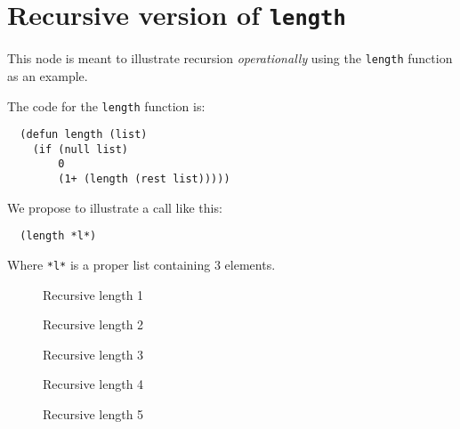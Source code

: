 \chapter{Recursive version of \texttt{length}}

This node is meant to illustrate recursion \emph{operationally} using
the \texttt{length} function as an example.

The code for the \texttt{length} function is:

\begin{verbatim}
  (defun length (list)
    (if (null list)
        0
        (1+ (length (rest list)))))
\end{verbatim}

We propose to illustrate a call like this:

\begin{verbatim}
  (length *l*)
\end{verbatim}

Where \texttt{*l*} is a proper list containing $3$ elements.

\begin{figure}
\begin{center}
\end{center}
\caption{\label{fig-recursion-length-1}
Recursive length 1}
\end{figure}

\begin{figure}
\begin{center}
\end{center}
\caption{\label{fig-recursion-length-2}
Recursive length 2}
\end{figure}

\begin{figure}
\begin{center}
\end{center}
\caption{\label{fig-recursion-length-3}
Recursive length 3}
\end{figure}

\begin{figure}
\begin{center}
\end{center}
\caption{\label{fig-recursion-length-4}
Recursive length 4}
\end{figure}

\begin{figure}
\begin{center}
\end{center}
\caption{\label{fig-recursion-length-5}
  Recursive length 5}
\end{figure}


